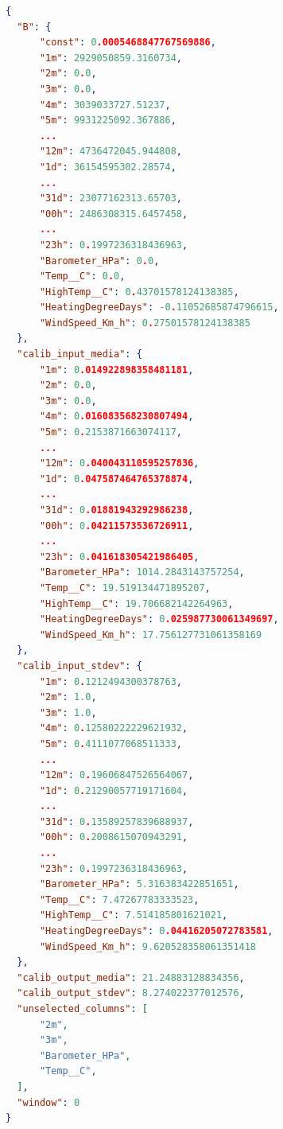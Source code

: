 \documentclass{rapportECL}
\begin{document}
\begin{lstlisting}[caption={Esempio modello json creato.},label={esempio json},language=json]
{
  "B": {
      "const": 0.0005468847767569886,
      "1m": 2929050859.3160734,
      "2m": 0.0,
      "3m": 0.0,
      "4m": 3039033727.51237,
      "5m": 9931225092.367886,
      ...
      "12m": 4736472045.944808,
      "1d": 36154595302.28574,
      ...
      "31d": 23077162313.65703,
      "00h": 2486308315.6457458,
      ...
      "23h": 0.1997236318436963,
      "Barometer_HPa": 0.0,
      "Temp__C": 0.0,
      "HighTemp__C": 0.43701578124138385,
      "HeatingDegreeDays": -0.11052685874796615,
      "WindSpeed_Km_h": 0.27501578124138385
  },
  "calib_input_media": {
      "1m": 0.014922898358481181,
      "2m": 0.0,
      "3m": 0.0,
      "4m": 0.016083568230807494,
      "5m": 0.2153871663074117,
      ...
      "12m": 0.040043110595257836,
      "1d": 0.047587464765378874,
      ...
      "31d": 0.01881943292986238,
      "00h": 0.04211573536726911,
      ...
      "23h": 0.041618305421986405,
      "Barometer_HPa": 1014.2843143757254,
      "Temp__C": 19.519134471895207,
      "HighTemp__C": 19.706682142264963,
      "HeatingDegreeDays": 0.025987730061349697,
      "WindSpeed_Km_h": 17.756127731061358169
  },
  "calib_input_stdev": {
      "1m": 0.1212494300378763,
      "2m": 1.0,
      "3m": 1.0,
      "4m": 0.12580222229621932,
      "5m": 0.4111077068511333,
      ...
      "12m": 0.19606847526564067,
      "1d": 0.21290057719171604,
      ...
      "31d": 0.13589257839688937,
      "00h": 0.2008615070943291,
      ...
      "23h": 0.1997236318436963,
      "Barometer_HPa": 5.316383422851651,
      "Temp__C": 7.47267783333523,
      "HighTemp__C": 7.514185801621021,
      "HeatingDegreeDays": 0.04416205072783581,
      "WindSpeed_Km_h": 9.620528358061351418
  },
  "calib_output_media": 21.24883128834356,
  "calib_output_stdev": 8.274022377012576,
  "unselected_columns": [
      "2m",
      "3m",
      "Barometer_HPa",
      "Temp__C",
  ],
  "window": 0
}
        
  \end{lstlisting}
\end{document}
